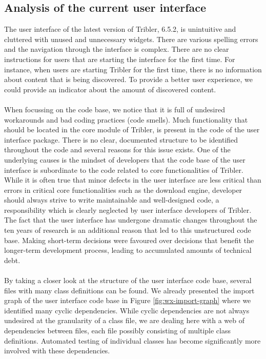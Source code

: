 \subsection{Analysis of the current user interface}
The user interface of the latest version of Tribler, 6.5.2, is unintuitive and cluttered with unused and unnecessary widgets. There are various spelling errors and the navigation through the interface is complex. There are no clear instructions for users that are starting the interface for the first time. For instance, when users are starting Tribler for the first time, there is no information about content that is being discovered. To provide a better user experience, we could provide an indicator about the amount of discovered content.\\\\
When focussing on the code base, we notice that it is full of undesired workarounds and bad coding practices (code smells). Much functionality that should be located in the core module of Tribler, is present in the code of the user interface package. There is no clear, documented structure to be identified throughout the code and several reasons for this issue exists. One of the underlying causes is the mindset of developers that the code base of the user interface is subordinate to the code related to core functionalities of Tribler. While it is often true that minor defects in the user interface are less critical than errors in critical core functionalities such as the download engine, developer should always strive to write maintainable and well-designed code, a responsibility which is clearly neglected by user interface developers of Tribler. The fact that the user interface has undergone dramatic changes throughout the ten years of research is an additional reason that led to this unstructured code base. Making short-term decisions were favoured over decisions that benefit the longer-term development process, leading to accumulated amounts of technical debt.\\\\
By taking a closer look at the structure of the user interface code base, several files with many class definitions can be found. We already presented the import graph of the user interface code base in Figure \ref{fig:wx-import-graph} where we identified many cyclic dependencies. While cyclic dependencies are not always undesired at the granularity of a class file, we are dealing here with a web of dependencies between files, each file possibly consisting of multiple class definitions. Automated testing of individual classes has become significantly more involved with these dependencies.\\\\
